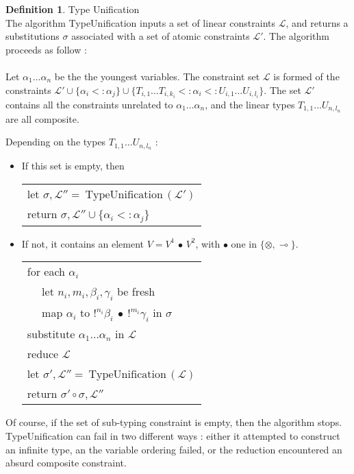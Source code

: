 \documentclass[9pt]{article}
\theoremstyle{plain}
\theoremstyle{definition}
\newtheorem{defn}{Definition}[subsection] %
\begin{document}
\begin{defn}{Type Unification} \\
	The algorithm TypeUnification inputs a set of linear constraints $\mathcal{L}$, and returns
	a substitutions $\sigma$ associated with a set of atomic constraints $\mathcal{L'}$.
	The algorithm proceeds as follow : \\
	\\
  Let $\alpha_1 \dots \alpha_n$ be the the youngest variables. The constraint set $\mathcal{L}$ is formed of the constraints
  $\mathcal{L'} \cup \{ \alpha_i <: \alpha_j \} \cup \{ T_{i, 1} \dots T_{i, k_i} <: \alpha_i <: U_{i, 1} \dots U_{i, l_i} \}$.
  The set $\mathcal{L'}$ contains all the constraints unrelated to $\alpha_1 \dots \alpha_n$,
  and the linear types $T_{1, 1} \dots U_{n, l_n}$ are all composite.
  		
  Depending on the types $T_{1, 1} \dots U_{n, l_n}$ :
	\begin{itemize}
		\item If this set is empty, then \\
			\begin{tabular}{l}
				let $\sigma, \mathcal{L''} = ~\text{TypeUnification}\,(\mathcal{L'})$ \\
				return $\sigma, \mathcal{L''} \cup \{ \alpha_i <: \alpha_j \}$
			\end{tabular}
	  
	  \item If not, it contains an element $V = V^1 \,\bullet \, V^2$, with $\bullet$ one in $\{ \otimes, \multimap \}$.
	  	\begin{tabular}{l}
	  		for each $\alpha_i$ \\
	  		~~ let $n_i, m_i, \beta_i, \gamma_i$ be fresh \\
	  		~~ map $\alpha_i$ to $!^{n_i} \beta_i ~\bullet~ !^{m_i}\gamma_i$ in $\sigma$ \\
	  		substitute $\alpha_1 \dots \alpha_n$ in $\mathcal{L}$ \\
	  		reduce $\mathcal{L}$ \\
	  		let $\sigma', \mathcal{L''} = ~\text{TypeUnification}\,(\mathcal{L})$ \\
	  		return $\sigma' \circ \sigma, \mathcal{L''}$
	  	\end{tabular}
  \end{itemize}

  Of course, if the set of sub-typing constraint is empty, then the algorithm stops.
  TypeUnification can fail in two different ways : either it attempted to construct an infinite
  type, an the variable ordering failed, or the reduction encountered an absurd composite constraint.
\end{defn}
\end{document}
